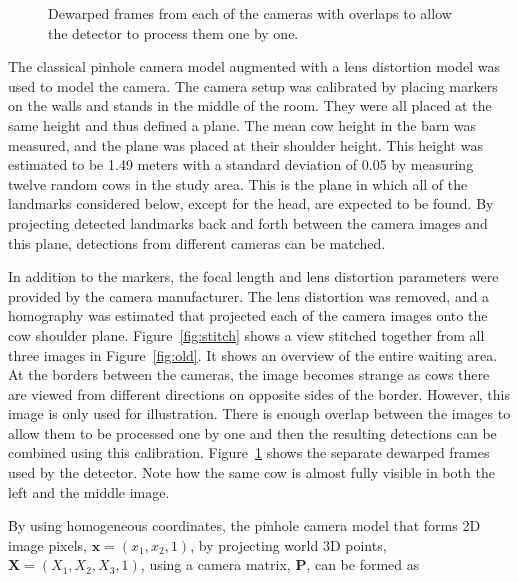 \documentclass{cta-author}
\begin{document}
\begin{figure}[b]
\begin{center}
\end{center}
  \caption{Dewarped frames from each of the cameras with overlaps to allow the detector to process them one
by one.}
  \label{fig:separate}
\end{figure}



The classical pinhole camera model augmented with a lens distortion model was used to model the camera.
The camera setup was calibrated by placing markers on the walls and stands in the middle of the room. They
were all placed at the same height and thus defined a plane. The mean cow height in the barn was measured,
and the plane was placed at their shoulder height. This height was estimated to be 1.49 meters with a
standard deviation of 0.05 by measuring twelve random cows in the study area.
This is the plane in which all of the landmarks considered below, except for the head, are expected to be
found. By projecting detected landmarks back and forth between the camera images and this plane, detections
from different cameras can be matched.

In addition to the markers, the focal length and lens distortion parameters were provided by the camera
manufacturer.
The lens distortion was removed, and a homography was estimated that projected each of the camera images onto
the cow shoulder plane. Figure~\ref{fig:stitch} shows a view stitched together from all three images in
Figure~\ref{fig:old}. It shows an overview of the entire waiting area. At the borders between the cameras,
the image becomes strange as cows there are viewed from different directions on opposite sides of the border.
However, this image is only used for illustration. There is enough overlap between the images to allow them
to be processed one by one and then the resulting detections can be combined using this calibration.
Figure~\ref{fig:separate} shows the separate dewarped frames used by the detector. Note how the same cow is
almost fully visible in both the left and the middle image.

By using homogeneous coordinates, the pinhole camera model that forms 2D image pixels, $\bm x=\left(x_1, x_2,
1\right)$, by projecting world 3D points, $\bm X=\left(X_1, X_2, X_3, 1\right)$, using a camera matrix, $\bm
P$, can be formed as
\end{document}
